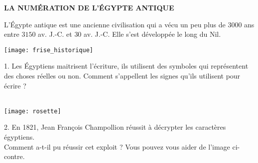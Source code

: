 \documentclass[12pt,a4paper]{article}
\begin{document}
\thispagestyle{empty}


\begin{center}
   \bf LA NUMÉRATION DE L'ÉGYPTE ANTIQUE \\ [1cm]
\end{center}
   
\noindent L'Égypte antique est une ancienne civilisation qui a vécu un peu plus de $3000$ ans entre $3150$ av. J.-C. et $30$ av. J.-C. Elle s'est développée le long du Nil.

\begin{center}
   \texttt{[image: frise\_historique]}
\end{center}

1. Les Égyptiens maitrisent l'écriture, ils utilisent des symboles qui représentent des choses réelles ou non. Comment s'appellent les signes qu'ils utilisent pour écrire ? \\ [2mm]
   \mbox{} \\ [3mm]
   
\begin{minipage}{8cm}
   \texttt{[image: rosette]}
\end{minipage}
\qquad
\begin{minipage}{8cm}
   2. En 1821, Jean François Champollion réussit à décrypter les caractères égyptiens. \\
   Comment a-t-il pu réussir cet exploit ? Vous pouvez vous aider de l'image ci-contre. \\ [3mm]
   \mbox{} \\ [3mm]
   \mbox{} \\ [3mm]
   \mbox{} \\ [3mm]
   \mbox{}
\end{minipage}

\bigskip
\end{document}
